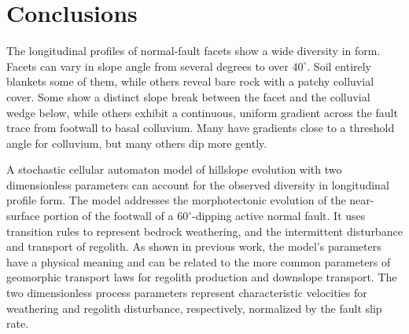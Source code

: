 





\section*{Conclusions}

The longitudinal profiles of normal-fault facets show a wide diversity in form. Facets can vary in slope angle from several degrees to over $40^\circ$. Soil entirely blankets some of them, while others reveal bare rock with a patchy colluvial cover. Some show a distinct slope break between the facet and the colluvial wedge below, while others exhibit a continuous, uniform gradient across the fault trace from footwall to basal colluvium. Many have gradients close to a threshold angle for colluvium, but many others dip more gently.

A stochastic cellular automaton model of hillslope evolution with two dimensionless parameters can account for the observed diversity in longitudinal profile form. The model addresses the morphotectonic evolution of the near-surface portion of the footwall of a $60^\circ$-dipping active normal fault. It uses transition rules to represent bedrock weathering,  and the intermittent disturbance and transport of regolith. As shown in previous work, the model's parameters have a physical meaning and can be related to the more common parameters of geomorphic transport laws for regolith production and downslope transport. The two dimensionless process parameters represent characteristic velocities for weathering and regolith disturbance, respectively, normalized by the fault slip rate.


